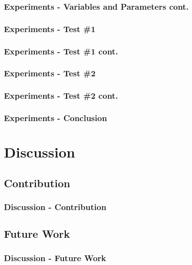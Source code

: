 \documentclass{beamer}
\begin{document}
\begin{frame}
\frametitle{Experiments - Variables and Parameters cont.}
\end{frame}

\begin{frame}
\frametitle{Experiments - Test \#1}
\end{frame}

\begin{frame}
\frametitle{Experiments - Test \#1 cont.}
\end{frame}

\begin{frame}
\frametitle{Experiments - Test \#2}
\end{frame}

\begin{frame}
\frametitle{Experiments - Test \#2 cont.}
\end{frame}

\begin{frame}
\frametitle{Experiments - Conclusion}
\end{frame}

\section{Discussion}

\subsection{Contribution}
\begin{frame}
\frametitle{Discussion - Contribution}
\end{frame}

\subsection{Future Work}
\begin{frame}
\frametitle{Discussion - Future Work}

\end{frame}
\end{document}
